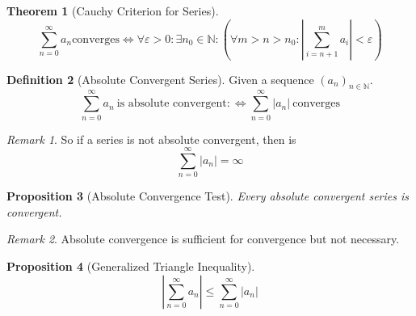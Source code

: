 \documentclass[english,titlepage]{uzhpub}
\theoremstyle{definition}
\newtheorem{definition}{Definition}[section]
\theoremstyle{plain}
\newtheorem{proposition}[definition]{Proposition}
\newtheorem{theorem}[definition]{Theorem} %
\theoremstyle{remark}
\newtheorem*{remark}{Remark}
\theoremstyle{example}
\begin{document}
   \begin{theorem}[Cauchy Criterion for Series]\label{thm:cauchy_crit_ser}
      \[\sum_{n=0}^\infty a_n\text{converges} \iff \forall \varepsilon > 0: \exists n_0 \in \mathbb{N}:  (\forall m > n > n_0: \left| \sum_{i = n + 1}^m a_i \right| < \varepsilon)\]
   \end{theorem}

   \begin{definition}[Absolute Convergent Series]
      Given a sequence \((a_n)_{n \in \mathbb{N}}\).
      \[\sum_{n=0}^\infty a_n~\text{is absolute convergent} :\iff \sum_{n=0}^\infty |a_n|~\text{converges}\]
   \end{definition}
   \begin{remark}
      So if a series is not absolute convergent, then is
      \[\sum_{n=0}^\infty |a_n| = \infty\]
   \end{remark}

   \begin{proposition}[Absolute Convergence Test]\label{pro:abs_conv_imply_conv}
      Every absolute convergent series is convergent.
   \end{proposition}
   \begin{remark}
      Absolute convergence is sufficient for convergence but not necessary.
   \end{remark}

   \begin{proposition}[Generalized Triangle Inequality]\label{pro:gener_triang_ineq}
      \[\left|\sum_{n = 0}^\infty a_n \right| \leq \sum_{n = 0}^\infty |a_n|\]
   \end{proposition}
\end{document}
